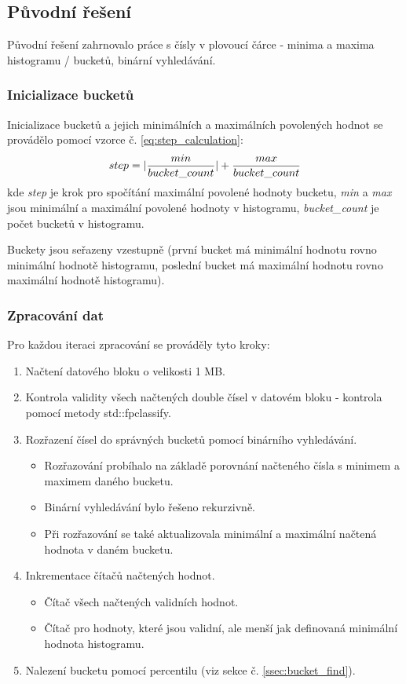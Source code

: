 \documentclass[12pt, a4paper]{article}
\begin{document}
\subsection{Původní řešení}
Původní řešení zahrnovalo práce s čísly v plovoucí čárce - minima a maxima histogramu / bucketů, binární vyhledávání.

\subsubsection{Inicializace bucketů}
Inicializace bucketů a jejich minimálních a maximálních povolených hodnot se provádělo pomocí vzorce č. \ref{eq:step_calculation}:
\begin{equation}
step = |\frac{min}{bucket\_count}| + \frac{max}{bucket\_count} \\
\label{eq:step_calculation} 
\end{equation}
kde \textit{step} je krok pro spočítání maximální povolené hodnoty bucketu, \textit{min} a \textit{max} jsou minimální a maximální povolené hodnoty v histogramu, \textit{bucket\_count} je počet bucketů v histogramu.

Buckety jsou seřazeny vzestupně (první bucket má minimální hodnotu rovno minimální hodnotě histogramu, poslední bucket má maximální hodnotu rovno maximální hodnotě histogramu).

\subsubsection{Zpracování dat} \label{sssec:old_zpracovani}
Pro každou iteraci zpracování se prováděly tyto kroky:
\begin{enumerate}
\item Načtení datového bloku o velikosti 1 MB.
\item Kontrola validity všech načtených double čísel v datovém bloku - kontrola pomocí metody std::fpclassify.
\item Rozřazení čísel do správných bucketů pomocí binárního vyhledávání.
\begin{itemize}
\item Rozřazování probíhalo na základě porovnání načteného čísla s minimem a maximem daného bucketu.
\item Binární vyhledávání bylo řešeno rekurzivně.
\item Při rozřazování se také aktualizovala minimální a maximální načtená hodnota v daném bucketu.
\end{itemize}
\item Inkrementace čítačů načtených hodnot.
\begin{itemize}
\item Čítač všech načtených validních hodnot.
\item Čítač pro hodnoty, které jsou validní, ale menší jak definovaná minimální hodnota histogramu.
\end{itemize}
\item Nalezení bucketu pomocí percentilu (viz sekce č. \ref{ssec:bucket_find}).
\end{enumerate}
\end{document}
